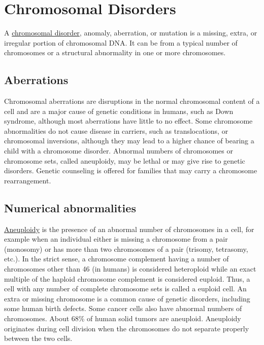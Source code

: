 \chapter{Chromosomal Disorders}\label{chromosomal-disorders}

A \href{https://en.wikipedia.org/wiki/Chromosome_abnormality}{chromosomal disorder}, anomaly, aberration, or mutation is a missing, extra, or irregular portion of chromosomal DNA. It can be from a typical number of chromosomes or a structural abnormality in one or more chromosomes.

\hypertarget{aberrations}{%
\section{Aberrations}\label{aberrations}}

Chromosomal aberrations are disruptions in the normal chromosomal content of a cell and are a major cause of genetic conditions in humans, such as Down syndrome, although most aberrations have little to no effect. Some chromosome abnormalities do not cause disease in carriers, such as translocations, or chromosomal inversions, although they may lead to a higher chance of bearing a child with a chromosome disorder. Abnormal numbers of chromosomes or chromosome sets, called aneuploidy, may be lethal or may give rise to genetic disorders. Genetic counseling is offered for families that may carry a chromosome rearrangement.

\hypertarget{numerical-abnormalities}{%
\section{Numerical abnormalities}\label{numerical-abnormalities}}

\href{https://en.wikipedia.org/wiki/Aneuploidy}{Aneuploidy} is the presence of an abnormal number of chromosomes in a cell, for example when an individual either is missing a chromosome from a pair (monosomy) or has more than two chromosomes of a pair (trisomy, tetrasomy, etc.). In the strict sense, a chromosome complement having a number of chromosomes other than 46 (in humans) is considered heteroploid while an exact multiple of the haploid chromosome complement is considered euploid. Thus, a cell with any number of complete chromosome sets is called a euploid cell. An extra or missing chromosome is a common cause of genetic disorders, including some human birth defects. Some cancer cells also have abnormal numbers of chromosomes. About 68\% of human solid tumors are aneuploid. Aneuploidy originates during cell division when the chromosomes do not separate properly between the two cells.

